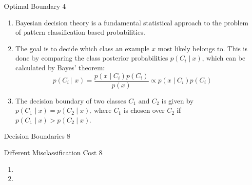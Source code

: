 \begin{questions}
	
	\begin{question}{Optimal Boundary }{4}		
	\begin{answer} 
			\begin{enumerate}
		\item 
		Bayesian decision theory is a fundamental statistical approach to the problem of pattern classification  based  probabilities.
		\item The goal is to decide which class an example $x$ most likely belongs to.
		This is done by comparing the class posterior probabilities $p(C_i\mid x)$, which can be calculated by Bayes' theorem:
		\[
		p(C_i \mid x)=\frac{p(x\mid C_i)p(C_i)}{p(x)} \propto p(x\mid C_i)p(C_i)
		\]
		\item The decision boundary of two classes $C_1$ and $C_2$ is given by $p(C_1\mid x)=p(C_2\mid x)$, where  $C_1$ is chosen over $C_2$ if $p(C_1\mid x)>p(C_2\mid x)$.
		\end{enumerate}
		
	\end{answer}
		
	\end{question}
	
	\begin{question}{Decision Boundaries  }{8}		
	\begin{answer} 

		
	\end{answer}
		
	\end{question}
	
	\begin{question}{Different Misclassification Cost  }{8}		
	\begin{answer} 
			\begin{enumerate}
		\item 
		\item 
		\end{enumerate}
		
	\end{answer}
		
	\end{question}
	
\end{questions}

